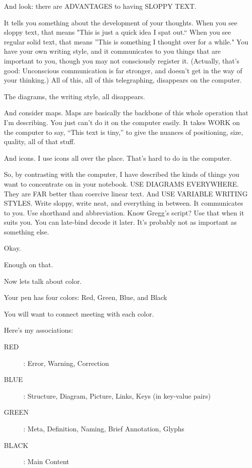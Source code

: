\documentclass[oneside,fontsize=13]{scrbook}
\newcommand\pause{\bigskip\noindent}
\begin{document}
And look: there are ADVANTAGES to having SLOPPY TEXT.

It tells you something about the development of your thoughts. When
you see sloppy text, that means "This is just a quick idea I spat
out.`` When you see regular solid text, that means ''This is something I
thought over for a while." You have your own writing style, and it
communicates to you things that are important to you, though you may
not consciously register it. (Actually, that's good: Unconscious
communication is far stronger, and doesn't get in the way of your
thinking.) All of this, all of this telegraphing, disappears on the
computer.

The diagrams, the writing style, all disappears.

And consider maps. Maps are basically the backbone of this whole
operation that I'm describing. You just can't do it on the computer
easily. It takes WORK on the computer to say, ``This text is tiny,'' to
give the nuances of positioning, size, quality, all of that stuff.

And icons. I use icons all over the place. That's hard to do in the
computer.

So, by contrasting with the computer, I have described the kinds of
things you want to concentrate on in your notebook. USE DIAGRAMS
EVERYWHERE. They are FAR better than coercive linear text. And USE
VARIABLE WRITING STYLES. Write sloppy, write neat, and everything in
between. It communicates to you. Use shorthand and abbreviation. Know
Gregg's script? Use that when it suits you. You can late-bind decode
it later. It's probably not as important as something else.

\pause 

Okay.

Enough on that.

Now lets talk about color.

Your pen has four colors: Red, Green, Blue, and Black

You will want to connect meeting with each color.

Here's my associations:

\begin{description}
  \item[RED ]:     Error, Warning, Correction
  \item[BLUE ]:    Structure, Diagram, Picture, Links, Keys (in key-value pairs)
  \item[GREEN ]:   Meta, Definition, Naming, Brief Annotation, Glyphs
  \item[BLACK ]:   Main Content
\end{description}
\end{document}
